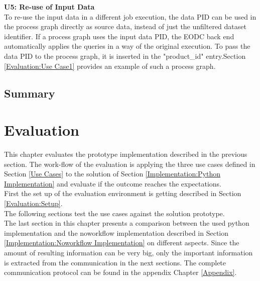 \documentclass[draft,final]{vutinfth} %
\begin{document}
\textbf{U5: Re-use of Input Data} \\
To re-use the input data in a different job execution, the data PID can be used in the process graph directly as source data, instead of just the unfiltered dataset identifier. If a process graph uses the input data PID, the EODC back end automatically applies the queries in a way of the original execution. To pass the data PID to the process graph, it is inserted in the "product\_id" entry.Section \ref{Evaluation:Use Case1} provides an example of such a process graph.  

\section{Summary}

\chapter{Evaluation}\label{Evaluation}
This chapter evaluates the prototype implementation described in the previous section. The work-flow of the evaluation is applying the three use cases defined in Section \ref{Use Cases} to the solution of Section \ref{Implementation:Python Implementation} and evaluate if the outcome reaches the expectations.\\ First the set up of the evaluation environment is getting described in Section \ref{Evaluation:Setup}. \\ The following sections test the use cases against the solution prototype.\\ The last section in this chapter presents a comparison between the used python implementation and the noworkflow implementation described in Section \ref{Implementation:Noworkflow Implementation} on different aspects. Since the amount of resulting information can be very big, only the important information is extracted from the communication in the next sections. The complete communication protocol can be found in the appendix Chapter \ref{Appendix}. 
\end{document}
